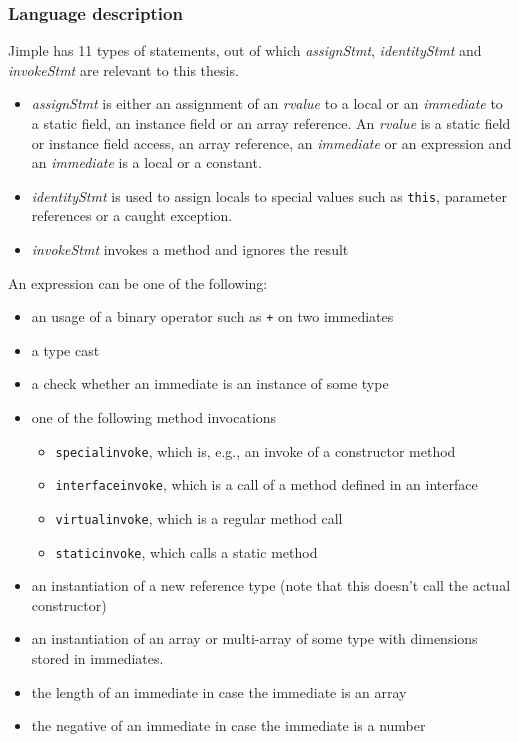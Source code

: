 \subsubsection{Language description}
Jimple has 11 types of statements, out of which \emph{assignStmt}, \emph{identityStmt} and \emph{invokeStmt} are relevant to this thesis.
\begin{itemize}
    \item \emph{assignStmt} is either an assignment of an \emph{rvalue} to a local or an \emph{immediate} to a static field, an instance field or an array reference.
    An \emph{rvalue} is a static field or instance field access, an array reference, an \emph{immediate} or an expression and an \emph{immediate} is a local or a constant.
    \item \emph{identityStmt} is used to assign locals to special values such as \texttt{this}, parameter references or a caught exception.
    \item \emph{invokeStmt} invokes a method and ignores the result
\end{itemize}
An expression can be one of the following:
\begin{itemize}
    \item an usage of a binary operator such as \texttt{+} on two immediates
    \item a type cast
    \item a check whether an immediate is an instance of some type
    \item one of the following method invocations
    \begin{itemize}
        \item \texttt{specialinvoke}, which is, e.g., an invoke of a constructor method
        \item \texttt{interfaceinvoke}, which is a call of a method defined in an interface
        \item \texttt{virtualinvoke}, which is a regular method call
        \item \texttt{staticinvoke}, which calls a static method
    \end{itemize}
    \item an instantiation of a new reference type (note that this doesn't call the actual constructor)
    \item an instantiation of an array or multi-array of some type with dimensions stored in immediates.
    \item the length of an immediate in case the immediate is an array
    \item the negative of an immediate in case the immediate is a number
\end{itemize}

